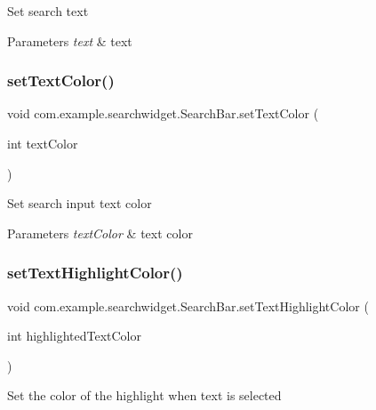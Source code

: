 Set search text


\begin{DoxyParams}{Parameters}
{\em text} & text \\
\hline
\end{DoxyParams}
\mbox{\label{classcom_1_1example_1_1searchwidget_1_1_search_bar_ac6711d0557a28b29ac41b0ed4e489e02}} 
\subsubsection{\texorpdfstring{setTextColor()}{setTextColor()}}
{\footnotesize\ttfamily void com.\+example.\+searchwidget.\+Search\+Bar.\+set\+Text\+Color (\begin{DoxyParamCaption}\item[{int}]{text\+Color }\end{DoxyParamCaption})}

Set search input text color


\begin{DoxyParams}{Parameters}
{\em text\+Color} & text color \\
\hline
\end{DoxyParams}
\mbox{\label{classcom_1_1example_1_1searchwidget_1_1_search_bar_a538551052205575951500130dc5ed591}} 
\subsubsection{\texorpdfstring{setTextHighlightColor()}{setTextHighlightColor()}}
{\footnotesize\ttfamily void com.\+example.\+searchwidget.\+Search\+Bar.\+set\+Text\+Highlight\+Color (\begin{DoxyParamCaption}\item[{int}]{highlighted\+Text\+Color }\end{DoxyParamCaption})}

Set the color of the highlight when text is selected


